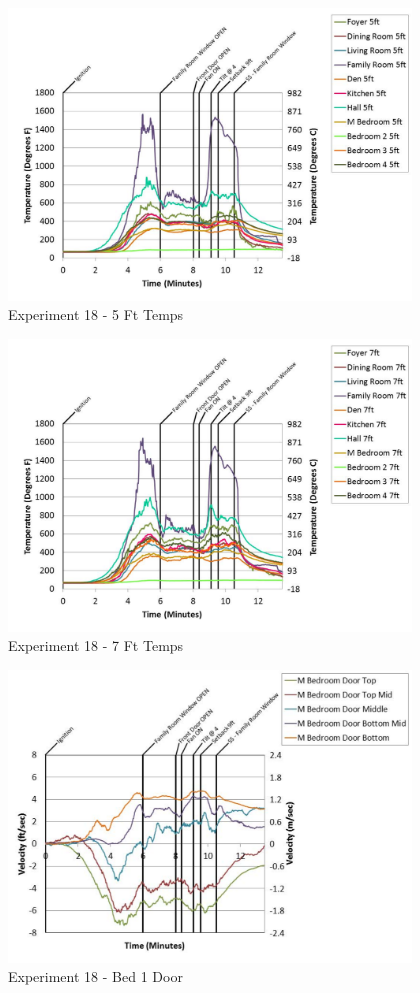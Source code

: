 \documentclass{article}
\begin{document}
\begin{appendices}
	\begin{figure}[h!]
		\centering
		\includegraphics[height=3.05in]{0_Images/Results_Charts/Exp_18_Charts/5FtTemps.pdf}
		\caption{Experiment 18 - 5 Ft Temps}
	\end{figure}
 

	\begin{figure}[h!]
		\centering
		\includegraphics[height=3.05in]{0_Images/Results_Charts/Exp_18_Charts/7FtTemps.pdf}
		\caption{Experiment 18 - 7 Ft Temps}
	\end{figure}
 
	\clearpage

	\begin{figure}[h!]
		\centering
		\includegraphics[height=3.05in]{0_Images/Results_Charts/Exp_18_Charts/Bed1Door.pdf}
		\caption{Experiment 18 - Bed 1 Door}
	\end{figure}
 


\end{appendices}
\end{document}
